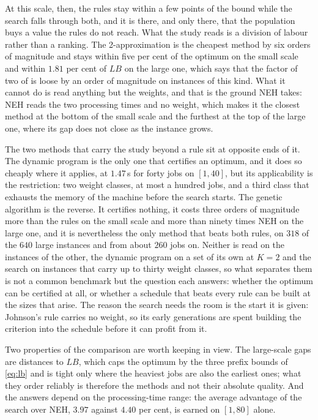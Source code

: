 \documentclass[12pt]{article}
\begin{document}
\begin{sloppypar}
        At this scale, then, the rules stay within a few points of the bound while the search falls
        through both, and it is there, and only there, that the population buys a value the rules do not
        reach. What the study reads is a division of labour rather than a ranking. The
        2-approximation is the cheapest method by six orders of magnitude and stays within five per cent
        of the optimum on the small scale and within $1.81$ per cent of $LB$ on the large one, which says
        that the factor of two of  is loose by an order of magnitude on instances of
        this kind. What it cannot do is read anything but the weights, and that is the ground NEH takes:
        NEH reads the two processing times and no weight, which makes it the closest method at the bottom
        of the small scale and the furthest at the top of the large one, where its gap does not close as
        the instance grows.
        
        The two methods that carry the study beyond a rule sit at opposite ends of it. The dynamic program
        is the only one that certifies an optimum, and it does so cheaply where it applies, at $1.47$\,s
        for forty jobs on $[1,40]$, but its applicability is the restriction: two weight classes, at most
        a hundred jobs, and a third class that exhausts the memory of the machine before the search
        starts. The genetic algorithm is the reverse. It certifies nothing, it costs three orders of
        magnitude more than the rules on the small scale and more than ninety times NEH on the large one,
        and it is nevertheless the only method that beats both rules, on $318$ of the $640$ large
        instances and from about $260$ jobs on. Neither is read on the instances of the other, the dynamic
        program on a set of its own at $K=2$ and the search on instances that carry up to thirty weight
        classes, so what separates them is not a common benchmark but the question each answers: whether
        the optimum can be certified at all, or whether a schedule that beats every rule can be built at
        the sizes that arise. The reason the search needs the room is the start it is given: Johnson's
        rule carries no weight, so its early generations are spent building the criterion into the
        schedule before it can profit from it.
        
        Two properties of the comparison are worth keeping in view. The large-scale gaps are distances to
        $LB$, which caps the optimum by the three prefix bounds of \cref{eq:lb} and is tight only where
        the heaviest jobs are also the earliest ones; what they order reliably is therefore the methods
        and not their absolute quality. And the answers depend on the processing-time range: the average
        advantage of the search over NEH, $3.97$ against $4.40$ per cent, is earned on $[1,80]$ alone.
        

\end{sloppypar}
\end{document}
